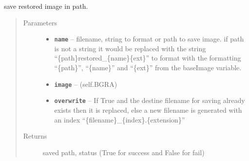 \documentclass[letterpaper,10pt,english]{sphinxmanual}
\begin{document}
\begin{fulllineitems}
\begin{fulllineitems}
\label{RRtoolbox.lib:RRtoolbox.lib.image.Image.load}
\end{fulllineitems}


\begin{fulllineitems}
\label{RRtoolbox.lib:RRtoolbox.lib.image.Image.path}
\end{fulllineitems}


\begin{fulllineitems}
\label{RRtoolbox.lib:RRtoolbox.lib.image.Image.save}
save restored image in path.
\begin{quote}\begin{description}
\item[{Parameters}] \leavevmode\begin{itemize}
\item {} 
\textbf{\texttt{name}} -- filename, string to format or path to save image.
if path is not a string it would be replaced with the string
``\{path\}restored\_\{name\}\{ext\}'' to format with the formatting
``\{path\}'', ``\{name\}'' and ``\{ext\}'' from the baseImage variable.

\item {} 
\textbf{\texttt{image}} -- (self.BGRA)

\item {} 
\textbf{\texttt{overwrite}} -- If True and the destine filename for saving already
exists then it is replaced, else a new filename is generated
with an index ``\{filename\}\_\{index\}.\{extension\}''

\end{itemize}

\item[{Returns}] \leavevmode
saved path, status (True for success and False for fail)

\end{description}\end{quote}

\end{fulllineitems}


\begin{fulllineitems}
\label{RRtoolbox.lib:RRtoolbox.lib.image.Image.shape}
\end{fulllineitems}


\end{fulllineitems}
\end{document}
